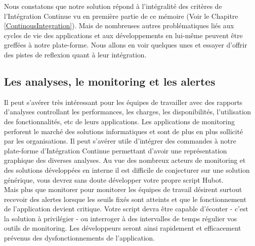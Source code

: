       Nous constatons que notre solution répond à l'intégralité des critères de l'Intégration Continue vu en première partie de ce mémoire (Voir le Chapitre \ref{ContinousIntegration}). Mais de nombreuses autres problématiques liés aux cycles de vie des applications et aux développements en lui-même peuvent être greffées à notre plate-forme. Nous allons en voir quelques unes et essayer d'offrir des pistes de reflexion quant à leur intégration.

      \subsection{Les analyses, le monitoring et les alertes}
      Il peut s'avérer très intéressant pour les équipes de travailler avec des rapports d'analyses controllant les performances, les charges, les disponibilités, l'utilisation des fonctionnalités, etc de leurs applications. Les applications de monitoring perforent le marché des solutions informatiques et sont de plus en plus sollicité par les organisations. Il peut s'avérer utile d'intégrer des commandes à notre plate-forme d'Intégration Continue permettant d'avoir une représentation graphique des diverses analyses. Au vue des nombreux acteurs de monitoring et des solutions développées en interne il est difficile de conjecturer sur une solution générique, vous devrez sans doute développer votre propre script Hubot.\\

      Mais plus que monitorer pour monitorer les équipes de travail désirent surtout recevoir des alertes lorsque les seuils fixés sont atteints et que le fonctionnement de l'application devient critique. Votre script devra être capable d'écouter - c'est la solution à privilégier - ou interroger à des intervalles de temps régulier vos outils de monitoring. Les développeurs seront ainsi rapidement et efficacement prévenus des dysfonctionnements de l'application.

